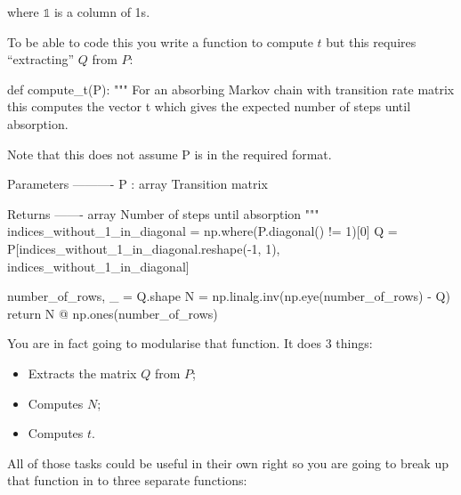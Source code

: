 where \(\mathbb{1}\) is a column of 1s.


To be able to code this you write a function to compute \(t\) but this
requires ``extracting'' \(Q\) from \(P\):




\begin{python}
def compute_t(P):
    """
    For an absorbing Markov chain with transition rate matrix this computes the
    vector t which gives the expected number of steps until absorption.

    Note that this does not assume P is in the required format.

    Parameters
    ----------
    P : array
        Transition matrix

    Returns
    -------
    array
        Number of steps until absorption
    """
    indices_without_1_in_diagonal = np.where(P.diagonal() != 1)[0]
    Q = P[indices_without_1_in_diagonal.reshape(-1, 1), indices_without_1_in_diagonal]

    number_of_rows, _ = Q.shape
    N = np.linalg.inv(np.eye(number_of_rows) - Q)
    return N @ np.ones(number_of_rows)
\end{python}





You are in fact going to modularise that function. It does 3 things:
\begin{itemize}
\item 

Extracts the matrix \(Q\) from \(P\);

\item 

Computes \(N\);

\item 

Computes \(t\).

\end{itemize}


All of those tasks could be useful in their own right so you are going to break
up that function in to three separate functions:




